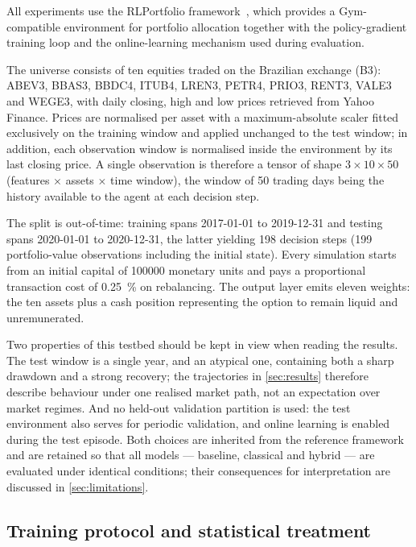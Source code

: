 \documentclass[aps,floatfix,superscriptaddress,twocolumn,tightenlines,amsmath,amssymb,nofootinbib,10pt,longbibliography,prl]{revtex4-2}
\begin{document}
All experiments use the RLPortfolio framework~\cite{RLportfolio}, which provides a Gym-compatible environment for portfolio allocation together with the policy-gradient training loop and the online-learning mechanism used during evaluation.

The universe consists of ten equities traded on the Brazilian exchange (B3): ABEV3, BBAS3, BBDC4, ITUB4, LREN3, PETR4, PRIO3, RENT3, VALE3 and WEGE3, with daily closing, high and low prices retrieved from Yahoo Finance. Prices are normalised per asset with a maximum-absolute scaler fitted exclusively on the training window and applied unchanged to the test window; in addition, each observation window is normalised inside the environment by its last closing price. A single observation is therefore a tensor of shape $3 \times 10 \times 50$ (features $\times$ assets $\times$ time window), the window of \num{50} trading days being the history available to the agent at each decision step.

The split is out-of-time: training spans 2017-01-01 to 2019-12-31 and testing spans 2020-01-01 to 2020-12-31, the latter yielding \num{198} decision steps (\num{199} portfolio-value observations including the initial state). Every simulation starts from an initial capital of \num{100000} monetary units and pays a proportional transaction cost of \SI{0.25}{\percent} on rebalancing. The output layer emits eleven weights: the ten assets plus a cash position representing the option to remain liquid and unremunerated.

Two properties of this testbed should be kept in view when reading the results. The test window is a single year, and an atypical one, containing both a sharp drawdown and a strong recovery; the trajectories in \ref{sec:results} therefore describe behaviour under one realised market path, not an expectation over market regimes. And no held-out validation partition is used: the test environment also serves for periodic validation, and online learning is enabled during the test episode. Both choices are inherited from the reference framework and are retained so that all models --- baseline, classical and hybrid --- are evaluated under identical conditions; their consequences for interpretation are discussed in \ref{sec:limitations}.

\subsection{Training protocol and statistical treatment}
\label{subsec:protocol}
\end{document}

